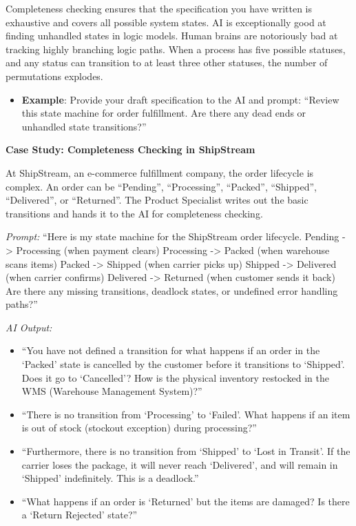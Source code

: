 Completeness checking ensures that the specification you have written is
exhaustive and covers all possible system states. AI is exceptionally
good at finding unhandled states in logic models. Human brains are
notoriously bad at tracking highly branching logic paths. When a process
has five possible statuses, and any status can transition to at least
three other statuses, the number of permutations explodes.

\begin{itemize}
\tightlist
\item
  \textbf{Example}: Provide your draft specification to the AI and
  prompt: ``Review this state machine for order fulfillment. Are there
  any dead ends or unhandled state transitions?''
\end{itemize}

\textbf{Case Study: Completeness Checking in ShipStream}

At ShipStream, an e-commerce fulfillment company, the order lifecycle is
complex. An order can be ``Pending'', ``Processing'', ``Packed'',
``Shipped'', ``Delivered'', or ``Returned''. The Product Specialist
writes out the basic transitions and hands it to the AI for completeness
checking.

\emph{Prompt:} ``Here is my state machine for the ShipStream order
lifecycle. Pending -\textgreater{} Processing (when payment clears)
Processing -\textgreater{} Packed (when warehouse scans items) Packed
-\textgreater{} Shipped (when carrier picks up) Shipped -\textgreater{}
Delivered (when carrier confirms) Delivered -\textgreater{} Returned
(when customer sends it back) Are there any missing transitions,
deadlock states, or undefined error handling paths?''

\emph{AI Output:}

\begin{itemize}
\tightlist
\item
  ``You have not defined a transition for what happens if an order in
  the `Packed' state is cancelled by the customer before it transitions
  to `Shipped'. Does it go to `Cancelled'? How is the physical inventory
  restocked in the WMS (Warehouse Management System)?''
\item
  ``There is no transition from `Processing' to `Failed'. What happens
  if an item is out of stock (stockout exception) during processing?''
\item
  ``Furthermore, there is no transition from `Shipped' to `Lost in
  Transit'. If the carrier loses the package, it will never reach
  `Delivered', and will remain in `Shipped' indefinitely. This is a
  deadlock.''
\item
  ``What happens if an order is `Returned' but the items are damaged? Is
  there a `Return Rejected' state?''
\end{itemize}

